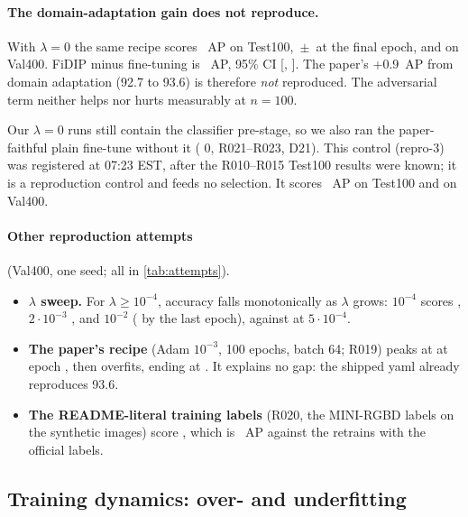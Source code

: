 \paragraph{The domain-adaptation gain does not reproduce.} With $\lambda=0$ the same recipe scores ~AP on Test100, \,{\footnotesize$\pm$\,} at the final epoch, and  on Val400.
FiDIP minus fine-tuning is ~AP, 95\% CI [, ].
The paper's +0.9~AP from domain adaptation (92.7 to 93.6) is therefore \emph{not} reproduced. The adversarial term neither helps nor hurts measurably at $n=100$.

Our $\lambda=0$ runs still contain the classifier pre-stage, so we also ran the paper-faithful plain fine-tune without it ( 0, R021--R023, D21). This control (repro-3) was registered at 07:23 EST, after the R010--R015 Test100 results were known; it is a reproduction control and feeds no selection. It scores ~AP on Test100 and  on Val400.

\paragraph{Other reproduction attempts} (Val400, one seed; all in \cref{tab:attempts}).
\begin{itemize}[leftmargin=*]
  \item \textbf{$\lambda$ sweep.} For $\lambda\ge10^{-4}$, accuracy falls monotonically as $\lambda$ grows: $10^{-4}$ scores , $2{\cdot}10^{-3}$ , and $10^{-2}$  ( by the last epoch), against  at $5{\cdot}10^{-4}$.
  \item \textbf{The paper's recipe} (Adam $10^{-3}$, 100 epochs, batch 64; R019) peaks at  at epoch , then overfits, ending at . It explains no gap: the shipped yaml already reproduces 93.6.
  \item \textbf{The README-literal training labels} (R020, the MINI-RGBD labels on the synthetic images) score , which is ~AP against the retrains with the official labels.
\end{itemize}

\subsection{Training dynamics: over- and underfitting}\label{sec:curves}

